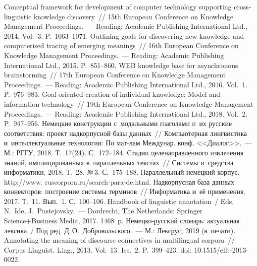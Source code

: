 \begin{multicols}{2}
{{\begin{thebibliography}{99}
Conceptual framework for development of computer technology supporting  
cross-linguistic knowledge discovery~// 15th European Conference on Knowledge 
Management Proceedings.~--- Reading: Academic Publishing International Ltd., 
2014. Vol.~3. P.~1063--1071.
 Outlining goals for discovering new knowledge and 
computerised tracing of emerging meanings~// 16th European Conference on 
Knowledge Management Proceedings.~--- Reading: Academic Publishing 
International Ltd., 2015. P.~851--860.
 WEB knowledge 
base for asynchronous brainstorming~// 17th European Conference on Knowledge 
Management Proceedings.~--- Reading: Academic Publishing International Ltd., 
2016. Vol.~1. P.~976--983.
 Goal-oriented creation of individual knowledge: Model and 
information technology~// 19th European Conference on Knowledge Management 
Proceedings.~--- Reading: Academic Publishing International Ltd., 2018. Vol.~2. 
P.~947--956.
 Немецкие конструкции 
с~модальными глаголами и~их русские соответствия: проект надкорпусной 
базы данных~// Компьютер\-ная лингвистика и~интеллектуальные технологии: 
По мат-лам Междунар. конф. <<Диалог>>.~--- М.: РГГУ, 2018. Т.~17(24). С.~172--184.
 Стадии целенаправленного извлечения знаний, 
имплицированных в~параллельных текстах~// Системы и~средства 
информатики, 2018. Т.~28. №\,3. С.~175--188.
Параллельный немецкий корпус. {\sf http://www. ruscorpora.ru/search-para-de.html}.
 Надкорпусная база 
данных коннекторов: построение сис\-те\-мы терминов~// Информатика и~её 
применения, 2017. Т.~11. Вып.~1. С.~100--106.
Handbook of linguistic annotation~/ Eds. N.~Ide,  J.~Pustejovsky.~--- Dordrecht, 
The Netherlands: Springer Science\;+\;Business Media, 2017. 1468~p.
Немецко-русский словарь: актуальная лексика~/ Под ред. 
Д.\,О.~Добровольского.~--- М.: Лексрус, 2019 (в~печати).
 Annotating the meaning of discourse connectives in 
multilingual corpora~// Corpus Linguist. Ling., 2013. Vol.~13. Iss.~2. 
P.~399--423. doi: 10.1515/cllt-2013-0022.
 \end{thebibliography}

 }
 }

\end{multicols}

